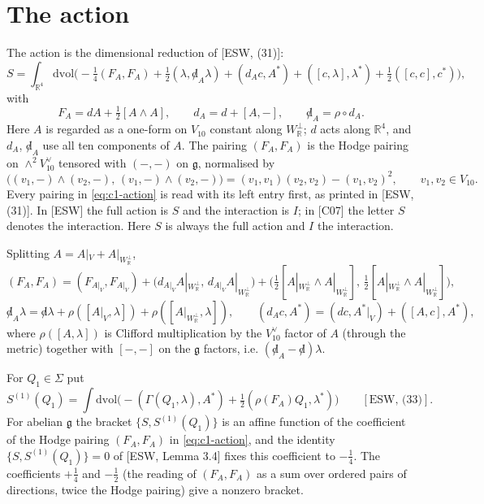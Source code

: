 \section{The action}

\begin{definition}[Action]
\label{def:c1-action}
The action is the dimensional reduction of [ESW, (31)]:
\begin{equation}
S=\int_{\mathbb R^4}\mathrm{dvol}\Big(-\tfrac14(F_A,F_A)+\tfrac12(\lambda,{\not d}_A\lambda)+(d_Ac,A^*)+([c,\lambda],\lambda^*)+\tfrac12([c,c],c^*)\Big),
\label{eq:c1-action}
\end{equation}
with
\[
F_A=dA+\tfrac12[A\wedge A],\qquad d_A=d+[A,-],\qquad {\not d}_A=\rho\circ d_A .
\]
Here $A$ is regarded as a one-form on $V_{10}$ constant along $W_{\mathbb R}^\perp$; $d$ acts along $\mathbb R^4$, and $d_A$, ${\not d}_A$ use all ten components of $A$. The pairing $(F_A,F_A)$ is the Hodge pairing on $\wedge^2V_{10}^\vee$ tensored with $(-,-)$ on $\mathfrak g$, normalised by
\[
\big((v_1,-)\wedge(v_2,-),\,(v_1,-)\wedge(v_2,-)\big)=(v_1,v_1)(v_2,v_2)-(v_1,v_2)^2,\qquad v_1,v_2\in V_{10}.
\]
Every pairing in \eqref{eq:c1-action} is read with its left entry first, as printed in [ESW, (31)]. In [ESW] the full action is $S$ and the interaction is $I$; in [C07] the letter $S$ denotes the interaction. Here $S$ is always the full action and $I$ the interaction.
\end{definition}

Splitting $A=A|_V+A|_{W_{\mathbb R}^\perp}$,
\[
(F_A,F_A)=(F_{A|_V},F_{A|_V})+\big(d_{A|_V}A|_{W_{\mathbb R}^\perp},\,d_{A|_V}A|_{W_{\mathbb R}^\perp}\big)+\big(\tfrac12[A|_{W_{\mathbb R}^\perp}\wedge A|_{W_{\mathbb R}^\perp}],\,\tfrac12[A|_{W_{\mathbb R}^\perp}\wedge A|_{W_{\mathbb R}^\perp}]\big),
\]
\[
{\not d}_A\lambda={\not d}\lambda+\rho([A|_V,\lambda])+\rho([A|_{W_{\mathbb R}^\perp},\lambda]),\qquad (d_Ac,A^*)=(dc,A^*|_V)+([A,c],A^*),
\]
where $\rho([A,\lambda])$ is Clifford multiplication by the $V_{10}^\vee$ factor of $A$ (through the metric) together with $[-,-]$ on the $\mathfrak g$ factors, i.e. $({\not d}_A-{\not d})\lambda$.

\begin{proposition}
\label{prop:c1-norm}
For $Q_1\in\Sigma$ put
\[
S^{(1)}(Q_1)=\int\mathrm{dvol}\Big(-(\Gamma(Q_1,\lambda),A^*)+\tfrac12(\rho(F_A)Q_1,\lambda^*)\Big)\qquad[\text{ESW, (33)}].
\]
For abelian $\mathfrak g$ the bracket $\{S,S^{(1)}(Q_1)\}$ is an affine function of the coefficient of the Hodge pairing $(F_A,F_A)$ in \eqref{eq:c1-action}, and the identity $\{S,S^{(1)}(Q_1)\}=0$ of [ESW, Lemma 3.4] fixes this coefficient to $-\tfrac14$. The coefficients $+\tfrac14$ and $-\tfrac12$ (the reading of $(F_A,F_A)$ as a sum over ordered pairs of directions, twice the Hodge pairing) give a nonzero bracket.
\end{proposition}

